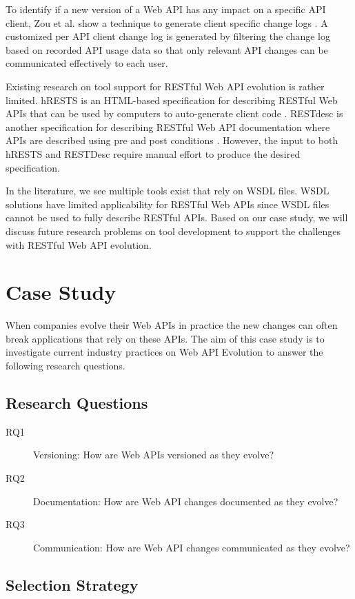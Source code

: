 \documentclass[conference]{IEEEtran}
\begin{document}
To identify if a new version of a Web API has any impact on a specific API client,  Zou et al. show a technique to generate client specific change logs \cite{le2008synchronizing}. A customized per API client change log is generated by filtering the change log based on  recorded API usage data so that only relevant API changes can be communicated effectively to each user.

Existing research on tool support for RESTful Web API evolution is rather limited. hRESTS is an HTML-based specification for describing RESTful Web APIs that can be used by computers to auto-generate client code \cite{4740521}. RESTdesc is another specification for describing RESTful Web API documentation where APIs are described using pre and post conditions \cite{RESTdesc}. However, the input to both hRESTS and RESTDesc require manual effort to produce the desired specification.

In the literature, we see multiple tools exist that rely on WSDL files. WSDL solutions have limited applicability for RESTful Web APIs since WSDL files cannot be used to fully describe RESTful APIs. Based on our case study, we will discuss future research problems on tool development to support the challenges with RESTful Web API evolution.

\section{Case Study}
When companies evolve their Web APIs in practice the new changes can often break applications that rely on these APIs. The aim of this case study is to investigate current industry practices on Web API Evolution to answer the following research questions.

\subsection{Research Questions} %

\begin{description}
  \item[RQ1] Versioning: How are Web APIs versioned as they evolve?
  \item[RQ2] Documentation: How are Web API changes documented as they evolve?
  \item[RQ3] Communication: How are Web API changes communicated as they evolve?
\end{description}

\subsection{Selection Strategy} %
\label{sub:selection_strategy}
\end{document}
